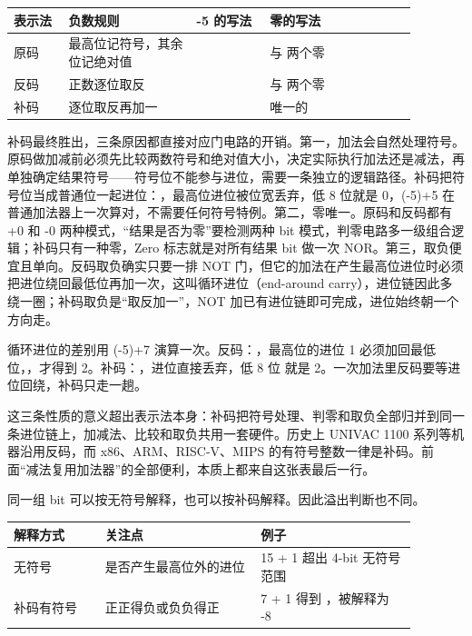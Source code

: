 \begin{longtable}{L{0.12\linewidth}L{0.28\linewidth}L{0.16\linewidth}L{0.32\linewidth}}
\toprule
表示法 & 负数规则 & -5 的写法 & 零的写法 \\
\midrule
原码 & 最高位记符号，其余位记绝对值 &  &  与  两个零 \\\tablerowrule
反码 & 正数逐位取反 &  &  与  两个零 \\\tablerowrule
补码 & 逐位取反再加一 &  & 唯一的  \\
\bottomrule
\end{longtable}

补码最终胜出，三条原因都直接对应门电路的开销。第一，加法会自然处理符号。原码做加减前必须先比较两数符号和绝对值大小，决定实际执行加法还是减法，再单独确定结果符号——符号位不能参与进位，需要一条独立的逻辑路径。补码把符号位当成普通位一起进位：，最高位进位被位宽丢弃，低 8 位就是 0，(-5)+5 在普通加法器上一次算对，不需要任何符号特例。第二，零唯一。原码和反码都有 +0 和 -0 两种模式，“结果是否为零”要检测两种 bit 模式，判零电路多一级组合逻辑；补码只有一种零，Zero 标志就是对所有结果 bit 做一次 NOR。第三，取负便宜且单向。反码取负确实只要一排 NOT 门，但它的加法在产生最高位进位时必须把进位绕回最低位再加一次，这叫循环进位（end-around carry），进位链因此多绕一圈；补码取负是“取反加一”，NOT 加已有进位链即可完成，进位始终朝一个方向走。

循环进位的差别用 (-5)+7 演算一次。反码：，最高位的进位 1 必须加回最低位，，才得到 2。补码：，进位直接丢弃，低 8 位  就是 2。一次加法里反码要等进位回绕，补码只走一趟。

这三条性质的意义超出表示法本身：补码把符号处理、判零和取负全部归并到同一条进位链上，加减法、比较和取负共用一套硬件。历史上 UNIVAC 1100 系列等机器沿用反码，而 x86、ARM、RISC-V、MIPS 的有符号整数一律是补码。前面“减法复用加法器”的全部便利，本质上都来自这张表最后一行。

同一组 bit 可以按无符号解释，也可以按补码解释。因此溢出判断也不同。

\begin{longtable}{L{0.2\linewidth}L{0.34\linewidth}L{0.34\linewidth}}
\toprule
解释方式 & 关注点 & 例子 \\
\midrule
无符号 & 是否产生最高位外的进位 & 15 + 1 超出 4-bit 无符号范围 \\\tablerowrule
补码有符号 & 正正得负或负负得正 & 7 + 1 得到 ，被解释为 -8 \\
\bottomrule
\end{longtable}


